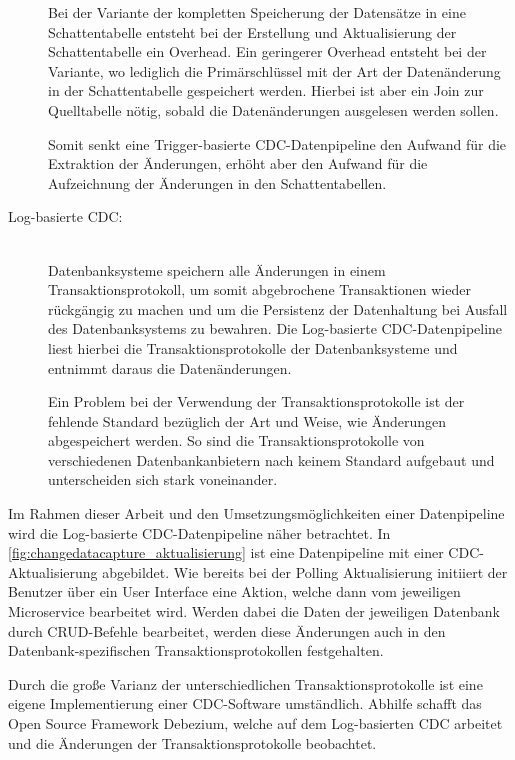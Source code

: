 \begin{description}
    Bei der Variante der kompletten Speicherung der Datensätze in eine Schattentabelle entsteht bei der Erstellung und Aktualisierung der Schattentabelle ein Overhead. Ein geringerer Overhead entsteht bei der Variante, wo lediglich die Primärschlüssel mit der Art der Datenänderung in der Schattentabelle gespeichert werden. Hierbei ist aber ein Join zur Quelltabelle nötig, sobald die Datenänderungen ausgelesen werden sollen.

    Somit senkt eine Trigger-basierte CDC-Datenpipeline den Aufwand für die Extraktion der Änderungen, erhöht aber den Aufwand für die Aufzeichnung der Änderungen in den Schattentabellen.

    \item[Log-basierte CDC:]\hfill \\
    Datenbanksysteme speichern alle Änderungen in einem Transaktionsprotokoll, um somit abgebrochene Transaktionen wieder rückgängig zu machen und um die Persistenz der Datenhaltung bei Ausfall des Datenbanksystems zu bewahren. Die Log-basierte CDC-Datenpipeline liest hierbei die Transaktionsprotokolle der Datenbanksysteme und entnimmt daraus die Datenänderungen.

    Ein Problem bei der Verwendung der Transaktionsprotokolle ist der fehlende Standard bezüglich der Art und Weise, wie Änderungen abgespeichert werden. So sind die Transaktionsprotokolle von verschiedenen Datenbankanbietern nach keinem Standard aufgebaut und unterscheiden sich stark voneinander.

\end{description}

Im Rahmen dieser Arbeit und den Umsetzungsmöglichkeiten einer Datenpipeline wird die Log-basierte CDC-Datenpipeline näher betrachtet. In \autoref{fig:changedatacapture_aktualisierung} ist eine Datenpipeline mit einer CDC-Aktualisierung abgebildet. Wie bereits bei der Polling Aktualisierung initiiert der Benutzer über ein User Interface eine Aktion, welche dann vom jeweiligen Microservice bearbeitet wird. Werden dabei die Daten der jeweiligen Datenbank durch CRUD-Befehle bearbeitet, werden diese Änderungen auch in den Datenbank-spezifischen Transaktionsprotokollen festgehalten.

Durch die große Varianz der unterschiedlichen Transaktionsprotokolle ist eine eigene Implementierung einer CDC-Software umständlich. Abhilfe schafft das Open Source Framework \glqq Debezium\grqq{}, welche auf dem Log-basierten CDC arbeitet und die Änderungen der Transaktionsprotokolle beobachtet.

